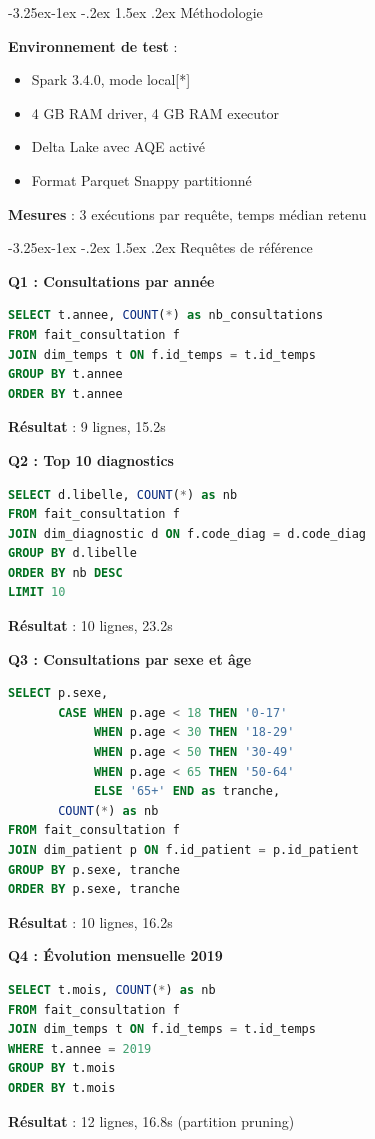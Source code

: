 \documentclass[12pt,a4paper]{article}
\makeatletter
\renewcommand\subsection{\@startsection{subsection}{2}{\z@}%
    {-3.25ex\@plus -1ex \@minus -.2ex}%
    {1.5ex \@plus .2ex}%
    {\normalfont\large\bfseries\color{blue!50!black}}}
\makeatother
\begin{document}
\subsection{Méthodologie}

\textbf{Environnement de test} :
\begin{itemize}
\item Spark 3.4.0, mode local[*]
\item 4 GB RAM driver, 4 GB RAM executor
\item Delta Lake avec AQE activé
\item Format Parquet Snappy partitionné
\end{itemize}

\textbf{Mesures} : 3 exécutions par requête, temps médian retenu

\subsection{Requêtes de référence}

\textbf{Q1 : Consultations par année}
\begin{lstlisting}[language=SQL, basicstyle=\small\ttfamily]
SELECT t.annee, COUNT(*) as nb_consultations
FROM fait_consultation f
JOIN dim_temps t ON f.id_temps = t.id_temps
GROUP BY t.annee
ORDER BY t.annee
\end{lstlisting}
\textbf{Résultat} : 9 lignes, 15.2s

\textbf{Q2 : Top 10 diagnostics}
\begin{lstlisting}[language=SQL, basicstyle=\small\ttfamily]
SELECT d.libelle, COUNT(*) as nb
FROM fait_consultation f
JOIN dim_diagnostic d ON f.code_diag = d.code_diag
GROUP BY d.libelle
ORDER BY nb DESC
LIMIT 10
\end{lstlisting}
\textbf{Résultat} : 10 lignes, 23.2s

\textbf{Q3 : Consultations par sexe et âge}
\begin{lstlisting}[language=SQL, basicstyle=\small\ttfamily]
SELECT p.sexe,
       CASE WHEN p.age < 18 THEN '0-17'
            WHEN p.age < 30 THEN '18-29'
            WHEN p.age < 50 THEN '30-49'
            WHEN p.age < 65 THEN '50-64'
            ELSE '65+' END as tranche,
       COUNT(*) as nb
FROM fait_consultation f
JOIN dim_patient p ON f.id_patient = p.id_patient
GROUP BY p.sexe, tranche
ORDER BY p.sexe, tranche
\end{lstlisting}
\textbf{Résultat} : 10 lignes, 16.2s

\textbf{Q4 : Évolution mensuelle 2019}
\begin{lstlisting}[language=SQL, basicstyle=\small\ttfamily]
SELECT t.mois, COUNT(*) as nb
FROM fait_consultation f
JOIN dim_temps t ON f.id_temps = t.id_temps
WHERE t.annee = 2019
GROUP BY t.mois
ORDER BY t.mois
\end{lstlisting}
\textbf{Résultat} : 12 lignes, 16.8s (partition pruning)
\end{document}
